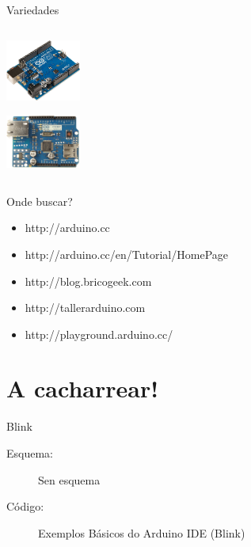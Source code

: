 \documentclass{beamer}
\begin{document}
\begin{frame}{Variedades}
\begin{columns}
\begin{column}{0.75\textwidth}
\begin{columns}
\begin{column}{0.2\textwidth}
\begin{center}
\includegraphics[width=70pt]{./img/Arduino_Uno.png}


\includegraphics[width=70pt]{./img/shield_ethernet.png}
\end{center}
\end{column}
\end{columns}

\end{column}
\end{columns}




\end{frame}

\begin{frame}{Onde buscar?}
\begin{itemize}
	\item http://arduino.cc
	\item http://arduino.cc/en/Tutorial/HomePage
	\item http://blog.bricogeek.com
	\item http://tallerarduino.com
	\item http://playground.arduino.cc/

\end{itemize}
\end{frame}




\section{A cacharrear!}
\begin{frame}
\huge{\centerline{\textbf{\color{blue} \insertsection}}}
\end{frame}



\begin{frame}{Blink}
\begin{description}
 \item[Esquema:] Sen esquema
 \item[Código:] Exemplos Básicos do Arduino IDE (Blink)
\end{description}
\end{frame}
\end{document}
